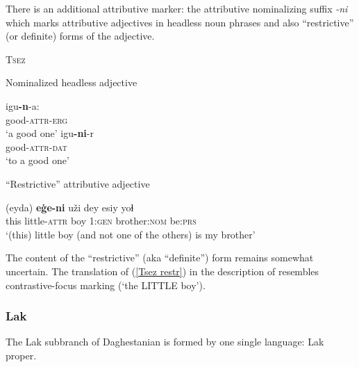 There is an additional attributive marker: the attributive nominalizing suffix \textit{-ni} which marks attributive adjectives in headless noun phrases and also “restrictive” (or definite) forms of the adjective.
\begin{exe}
\ex \textsc{Tsez} \citep{alekseev-etal2004}
\begin{xlist}
\ex	Nominalized headless adjective
\begin{xlist}
\ex
\gll	igu\textbf{-n}-a:\\
	good-\textsc{attr}-\textsc{erg}\\
\glt	‘a good one’
\ex
\gll	igu\textbf{-ni}-r\\
	good-\textsc{attr}-\textsc{dat}\\
\glt	‘to a good one’
\end{xlist}
\ex	“Restrictive” attributive adjective
\begin{xlist}
\ex	\label{Tsez restr}
\gll	(eyda) \textbf{eġe-ni} uži dey esiy yoɬ\\
	this little-\textsc{attr} boy \textsc{1:gen} brother:\textsc{nom} be:\textsc{prs}\\
\glt	‘(this) little boy (and not one of the others) is my brother’
\end{xlist}
\end{xlist}
\end{exe}
The content of the “restrictive” (aka “definite”) form remains somewhat uncertain. The translation of (\ref{Tsez restr}) in the description of \citet[128]{alekseev-etal2004} resembles contrastive-focus marking (‘the LITTLE boy’).

\subsubsection{Lak}
The Lak subbranch of Daghestanian is formed by one single language: Lak proper.

